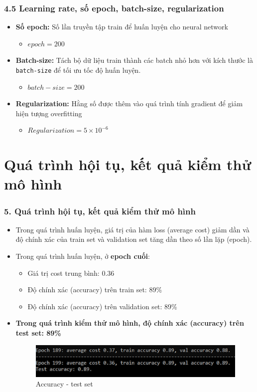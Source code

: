 \documentclass{beamer}
\begin{document}
\begin{frame}
\frametitle{4.5 Learning rate, số epoch, batch-size, regularization}
\begin{itemize}
 \item \textbf{Số epoch:} Số lần truyền tập train để huấn luyện cho neural network
    \begin{itemize}
        \item $epoch = 200$
    \end{itemize}
    \item \textbf{Batch-size:} Tách bộ dữ liệu train thành các batch nhỏ hơn với kích thước là \texttt{batch-size} để tối ưu tốc độ huấn luyện.
    \begin{itemize}
        \item $batch-size = 200$
    \end{itemize}
    \item \textbf{Regularization:} Hằng số được thêm vào quá trình tính gradient để giảm hiện tượng
overfitting 
    \begin{itemize}
        \item $Regularization = 5\times 10^{-6}$
    \end{itemize}
\end{itemize}
    
\end{frame}

\section{Quá trình hội tụ, kết quả kiểm thử mô hình} 

\begin{frame}
\frametitle{5. Quá trình hội tụ, kết quả kiểm thử mô hình}
\begin{itemize}
    \item Trong quá trình huấn luyện, giá trị của hàm loss (average cost) giảm dần và độ chính xác của train set và validation set tăng dần theo số lần lặp (epoch).
    \item Trong quá trình huấn luyện, ở \textbf{epoch cuối}:
    \begin{itemize}
        \item Giá trị cost trung bình: 0.36
        \item Độ chính xác (accuracy) trên train set: 89\%
        \item Độ chính xác (accuracy) trên validation set: 89\%
    \end{itemize}
    \item \textbf{Trong quá trình kiểm thử mô hình, độ chính xác (accuracy) trên test set: 89\%}
    \begin{figure}
        \centering
        \includegraphics[width=1\linewidth]{images/testacc.png}
        \caption{Accuracy - test set}
        
    \end{figure}
\end{itemize}
\end{frame}
\end{document}
